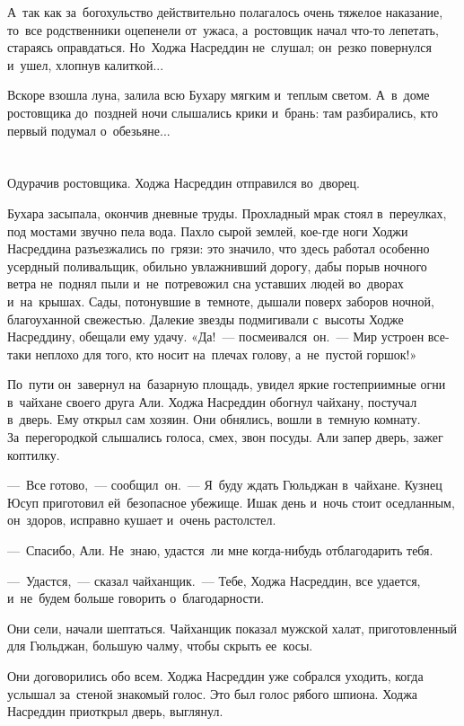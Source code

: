 \documentclass[12pt,a4paper]{book}
\begin{document}
А~так как за~богохульство действительно полагалось очень тяжелое наказание, то~все родственники оцепенели от~ужаса, а~ростовщик начал что-то лепетать, стараясь оправдаться. Но~Ходжа Насреддин не~слушал; он~резко повернулся и~ушел, хлопнув калиткой...

Вскоре взошла луна, залила всю Бухару мягким и~теплым светом. А~в~доме ростовщика до~поздней ночи слышались крики и~брань: там разбирались, кто первый подумал о~обезьяне...


\chapter{}

Одурачив ростовщика. Ходжа Насреддин отправился во~дворец.

Бухара засыпала, окончив дневные труды. Прохладный мрак стоял в~переулках, под мостами звучно пела вода. Пахло сырой землей, кое-где ноги Ходжи Насреддина разъезжались по~грязи: это значило, что здесь работал особенно усердный поливальщик, обильно увлажнивший дорогу, дабы порыв ночного ветра не~поднял пыли и~не~потревожил сна уставших людей во~дворах и~на~крышах. Сады, потонувшие в~темноте, дышали поверх заборов ночной, благоуханной свежестью. Далекие звезды подмигивали с~высоты Ходже Насреддину, обещали ему удачу. «Да!~— посмеивался~он.~— Мир устроен все-таки неплохо для того, кто носит на~плечах голову, а~не~пустой горшок!»

По~пути он~завернул на~базарную площадь, увидел яркие гостеприимные огни в~чайхане своего друга Али. Ходжа Насреддин обогнул чайхану, постучал в~дверь. Ему открыл сам хозяин. Они обнялись, вошли в~темную комнату. За~перегородкой слышались голоса, смех, звон посуды. Али запер дверь, зажег коптилку.

—~Все готово,~— сообщил~он.~— Я~буду ждать Гюльджан в~чайхане. Кузнец Юсуп приготовил ей~безопасное убежище. Ишак день и~ночь стоит оседланным, он~здоров, исправно кушает и~очень растолстел.

—~Спасибо, Али. Не~знаю, удастся~ли мне когда-нибудь отблагодарить тебя.

—~Удастся,~— сказал чайханщик.~— Тебе, Ходжа Насреддин, все удается, и~не~будем больше говорить о~благодарности.

Они сели, начали шептаться. Чайханщик показал мужской халат, приготовленный для Гюльджан, большую чалму, чтобы скрыть ее~косы.

Они договорились обо всем. Ходжа Насреддин уже собрался уходить, когда услышал за~стеной знакомый голос. Это был голос рябого шпиона. Ходжа Насреддин приоткрыл дверь, выглянул.
\end{document}
